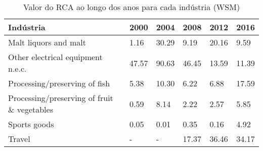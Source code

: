 \begin{table}
\centering
\caption{Valor do RCA ao longo dos anos para cada indústria (WSM)}
\label{tab:ex3-tempo-WSM}
\begin{tabular}{p{6cm}p{1.5cm}p{1.5cm}p{1.5cm}p{1.5cm}p{1.5cm}}
\toprule
                                  Indústria &  2000 &  2004 &  2008 &  2012 &  2016 \\
\midrule
                      Malt liquors and malt &  1.16 & 30.29 &  9.19 & 20.16 &  9.59 \\
          Other electrical equipment n.e.c. & 47.57 & 90.63 & 46.45 & 13.59 & 11.39 \\
              Processing/preserving of fish &  5.38 & 10.30 &  6.22 &  6.88 & 17.59 \\
Processing/preserving of fruit \& vegetables &  0.59 &  8.14 &  2.22 &  2.57 &  5.85 \\
                               Sports goods &  0.05 &  0.01 &  0.35 &  0.16 &  4.92 \\
                                     Travel &     - &     - & 17.37 & 36.46 & 34.17 \\
\bottomrule
\end{tabular}
\end{table}
